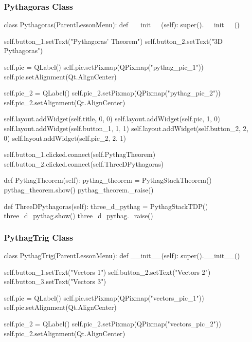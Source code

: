 \begin{landscape}
\subsubsection{Pythagoras Class}

\begin{python}
class Pythagoras(ParentLessonMenu):
    def __init__(self):
        super().__init__()

        self.button_1.setText("Pythagoras' Theorem")
        self.button_2.setText("3D Pythagoras")

        self.pic = QLabel()
        self.pic.setPixmap(QPixmap("pythag_pic_1"))
        self.pic.setAlignment(Qt.AlignCenter)


        self.pic_2 = QLabel()
        self.pic_2.setPixmap(QPixmap("pythag_pic_2"))
        self.pic_2.setAlignment(Qt.AlignCenter)

        self.layout.addWidget(self.title, 0, 0)
        self.layout.addWidget(self.pic, 1, 0)
        self.layout.addWidget(self.button_1, 1, 1)
        self.layout.addWidget(self.button_2, 2, 0)
        self.layout.addWidget(self.pic_2, 2, 1)

        self.button_1.clicked.connect(self.PythagTheorem)
        self.button_2.clicked.connect(self.ThreeDPythagoras)
    
    def PythagTheorem(self):
        pythag_theorem = PythagStackTheorem()
        pythag_theorem.show()
        pythag_theorem._raise()

    def ThreeDPythagoras(self):
        three_d_pythag = PythagStackTDP()
        three_d_pythag.show()
        three_d_pythag._raise()
\end{python}

\subsubsection{PythagTrig Class}

\begin{python}
class PythagTrig(ParentLessonMenu):
    def __init__(self):
        super().__init__()

        self.button_1.setText("Vectors 1")
        self.button_2.setText("Vectors 2")
        self.button_3.setText("Vectors 3")

        self.pic = QLabel()
        self.pic.setPixmap(QPixmap("vectors_pic_1"))
        self.pic.setAlignment(Qt.AlignCenter)

        self.pic_2 = QLabel()
        self.pic_2.setPixmap(QPixmap("vectors_pic_2"))
        self.pic_2.setAlignment(Qt.AlignCenter)


\end{python}
\end{landscape}
